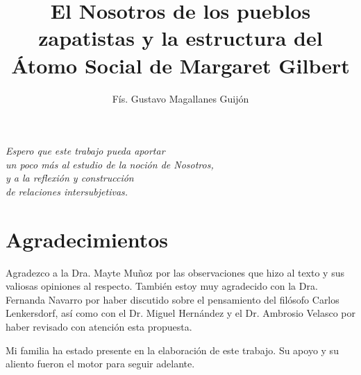 \documentclass[oneside]{book}
\begin{document}
\title{El Nosotros de los pueblos zapatistas y la estructura del Átomo Social de Margaret Gilbert} %

\author{Fís. Gustavo Magallanes Guijón}
\date{}
\thispagestyle{empty}
\maketitle
\thispagestyle{empty}
\maketitle

\thispagestyle{empty}
\setlength{\headheight}{15pt}
\frontmatter

\chapter*{}
\begin{flushright}
    
    \textit{Espero que este trabajo pueda aportar\\ un poco más al estudio de la noción de Nosotros, \\y a la reflexión y construcción\\de relaciones intersubjetivas. }
\end{flushright}
\chapter*{Agradecimientos}


Agradezco a la Dra. Mayte Muñoz por las observaciones que hizo al texto y sus valiosas opiniones al respecto. También estoy muy agradecido con la Dra. Fernanda Navarro por haber discutido sobre el pensamiento del filósofo Carlos Lenkersdorf, así como con el Dr. Miguel Hernández y el Dr. Ambrosio Velasco por haber revisado con atención esta propuesta.

        Mi familia ha estado presente en la elaboración de este trabajo. Su apoyo y su aliento fueron el motor para seguir adelante.
\\
\\
\\
\\
\end{document}
